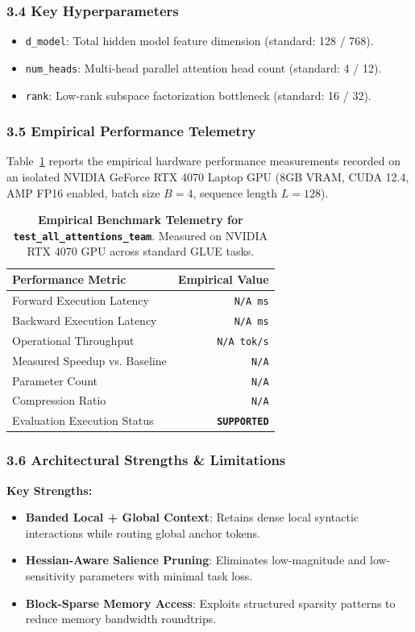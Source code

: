 \subsubsection*{3.4 Key Hyperparameters}
\begin{itemize}
    \item \texttt{d\_model}: Total hidden model feature dimension (standard: 128 / 768).
    \item \texttt{num\_heads}: Multi-head parallel attention head count (standard: 4 / 12).
    \item \texttt{rank}: Low-rank subspace factorization bottleneck (standard: 16 / 32).
\end{itemize}

\subsubsection*{3.5 Empirical Performance Telemetry}
Table~\ref{tab:telemetry_test_all_attentions_team} reports the empirical hardware performance measurements recorded on an isolated NVIDIA GeForce RTX 4070 Laptop GPU (8GB VRAM, CUDA 12.4, AMP FP16 enabled, batch size $B=4$, sequence length $L=128$).

\begin{table}[h]
\centering
\small
\caption{\textbf{Empirical Benchmark Telemetry for \texttt{test\_all\_attentions\_team}}. Measured on NVIDIA RTX 4070 GPU across standard GLUE tasks.}
\label{tab:telemetry_test_all_attentions_team}
\begin{tabular*}{\columnwidth}{@{\extracolsep{\fill}}lr}
\toprule
\textbf{Performance Metric} & \textbf{Empirical Value} \\
\midrule
Forward Execution Latency & \texttt{N/A ms} \\
Backward Execution Latency & \texttt{N/A ms} \\
Operational Throughput & \texttt{N/A tok/s} \\
Measured Speedup vs. Baseline & \texttt{N/A} \\
Parameter Count & \texttt{N/A} \\
Compression Ratio & \texttt{N/A} \\
Evaluation Execution Status & \textbf{\texttt{SUPPORTED}} \\
\bottomrule
\end{tabular*}
\end{table}

\subsubsection*{3.6 Architectural Strengths \& Limitations}
\textbf{Key Strengths:}
\begin{itemize}
    \item \textbf{Banded Local + Global Context}: Retains dense local syntactic interactions while routing global anchor tokens.
    \item \textbf{Hessian-Aware Salience Pruning}: Eliminates low-magnitude and low-sensitivity parameters with minimal task loss.
    \item \textbf{Block-Sparse Memory Access}: Exploits structured sparsity patterns to reduce memory bandwidth roundtrips.
\end{itemize}


